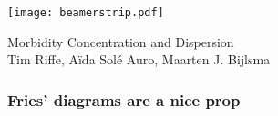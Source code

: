 \documentclass[20pt]{beamer}
\begin{document}


\begin{frame}[plain]
	\vspace{-4.4cm}
 \centerline{\texttt{[image: beamerstrip.pdf]}}

	
	\huge
	\vspace{1em}
	
	Morbidity Concentration and Dispersion \\
	\vspace{1em}
	\large 
	Tim Riffe, A{\"i}da Sol\'{e} Auro, Maarten J. Bijlsma
\end{frame}

\begin{frame}
\frametitle{Fries' diagrams are a nice prop}
\begin{center}
\end{center}
\end{frame}


%



\end{document}
